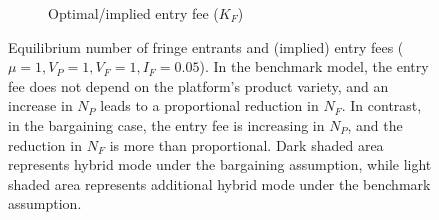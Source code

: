 \documentclass[a4paper]{article}
\begin{document}
\begin{figure}
\begin{subfigure}[b]{0.45\textwidth}
        \caption{Optimal/implied entry fee ($K_F$)}
        \label{fig:entry_fee}
    \end{subfigure}
    \caption{Equilibrium number of fringe entrants and (implied) entry fees ($\mu = 1, V_P = 1, V_F = 1, I_F = 0.05$). In the benchmark model, the entry fee does not depend on the platform's product variety, and an increase in $N_P$ leads to a proportional reduction in $N_F$. In contrast, in the bargaining case, the entry fee is increasing in $N_P$, and the reduction in $N_F$ is more than proportional. Dark shaded area represents hybrid mode under the bargaining assumption, while light shaded area represents additional hybrid mode under the benchmark assumption.}
    \label{fig:entry_and_fees}
\end{figure}
\end{document}
